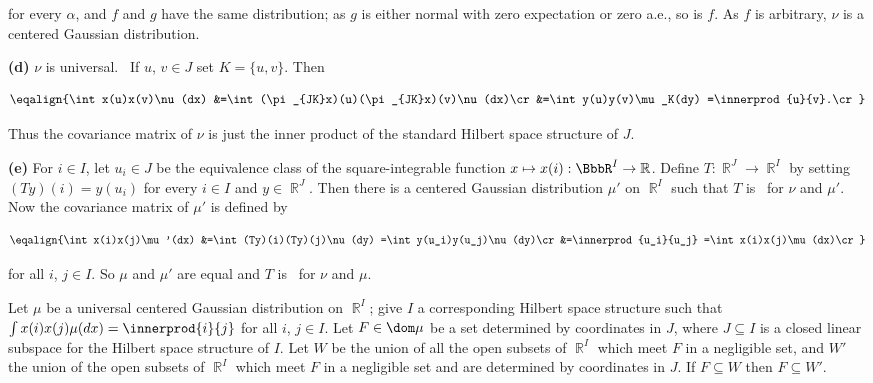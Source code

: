 {\noindent for every $\alpha$, and $f$ and $g$ have the same
distribution;  as $g$ is either normal with zero expectation or zero
a.e., so
is $f$.   As $f$ is arbitrary, $\nu$ is a centered Gaussian
distribution.

\medskip

{\bf (d)} $\nu$ is universal.   \Prf\ If $u$, $v\in J$ set
$K=\{u,v\}$.   Then

$$\eqalign{\int x(u)x(v)\nu(dx)
&=\int(\pi_{JK}x)(u)(\pi_{JK}x)(v)\nu(dx)\cr
&=\int y(u)y(v)\mu_K(dy)
=\innerprod{u}{v}.\cr}$$

\noindent Thus the covariance matrix of $\nu$ is just the inner product
of the standard Hilbert space structure of $J$.\ \Qed

\medskip

{\bf (e)} For $i\in I$, let $u_i\in J$ be the equivalence class of the
square-integrable function $x\mapsto x(i):\BbbR^I\to\Bbb R$.   Define
$T:\BbbR^J\to\BbbR^I$ by setting $(Ty)(i)=y(u_i)$ for every
$i\in I$ and $y\in\BbbR^J$.   Then there is a centered Gaussian
distribution $\mu'$ on $\BbbR^I$ such that $T$ is \imp\ for $\nu$ and
$\mu'$.   Now the covariance matrix of $\mu'$ is defined by

$$\eqalign{\int x(i)x(j)\mu'(dx)
&=\int(Ty)(i)(Ty)(j)\nu(dy)
=\int y(u_i)y(u_j)\nu(dy)\cr
&=\innerprod{u_i}{u_j}
=\int x(i)x(j)\mu(dx)\cr}$$

\noindent for all $i$, $j\in I$.   So $\mu$ and $\mu'$ are equal and $T$
is \imp\ for $\nu$ and $\mu$.
}%

 Let $\mu$ be a universal centered Gaussian
distribution on $\BbbR^I$;  give $I$ a corresponding Hilbert space
structure such that $\int x(i)x(j)\mu(dx)=\innerprod{i}{j}$ for all $i$,
$j\in I$.   Let $F\in\dom\mu$ be a set determined by coordinates
in $J$, where $J\subseteq I$ is a closed linear subspace for the Hilbert
space structure of $I$.   Let $W$ be the union of all the open subsets
of $\BbbR^I$ which meet $F$ in a negligible set, and $W'$ the union of
the open subsets of $\BbbR^I$ which meet $F$ in a negligible set and are
determined by coordinates in $J$.   If $F\subseteq W$ then
$F\subseteq W'$.

